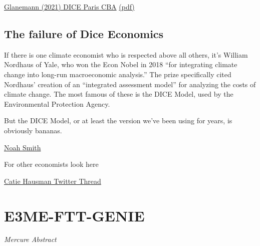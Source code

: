 \documentclass[
]{book}
\begin{document}
\href{https://www.nature.com/articles/s41467-019-13961-1}{Glanemann (2021) DICE Paris CBA}
\href{pdf/Glanemann_2021_DICE_Paris_CBA.pdf}{(pdf)}

\hypertarget{the-failure-of-dice-economics}{%
\subsection{The failure of Dice Economics}\label{the-failure-of-dice-economics}}

If there is one climate economist who is respected above all others, it's William Nordhaus of Yale, who won the Econ Nobel in 2018 ``for integrating climate change into long-run macroeconomic analysis.'' The prize specifically cited Nordhaus' creation of an ``integrated assessment model'' for analyzing the costs of climate change. The most famous of these is the DICE Model, used by the Environmental Protection Agency.

But the DICE Model, or at least the version we've been using for years, is obviously bananas.

\href{https://noahpinion.substack.com/p/why-has-climate-economics-failed}{Noah Smith}

For other economists look here

\href{https://twitter.com/CatieHausman/status/1381999336423362568}{Catie Hausman Twitter Thread}

\hypertarget{e3me-ftt-genie}{%
\section{E3ME-FTT-GENIE}\label{e3me-ftt-genie}}

\emph{Mercure Abstract}
\end{document}
